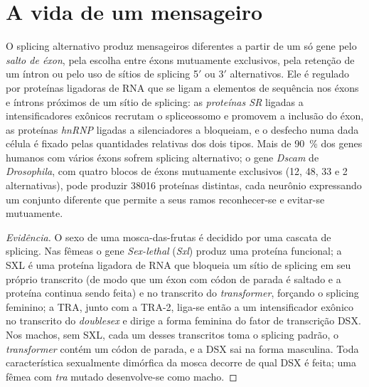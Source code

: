 \section{A vida de um mensageiro}

\begin{definition}\label{def:b3:rna-regulation:splicing}
O splicing alternativo produz mensageiros diferentes a partir de um só
gene pelo \emph{salto de éxon}, pela escolha entre éxons mutuamente
exclusivos, pela retenção de um íntron ou pelo uso de sítios de
splicing 5$'$ ou 3$'$ alternativos. Ele é regulado por proteínas
ligadoras de RNA que se ligam a elementos de sequência nos éxons e
íntrons próximos de um sítio de splicing: as \emph{proteínas SR}
ligadas a intensificadores exônicos recrutam o spliceossomo e promovem
a inclusão do éxon, as proteínas \emph{hnRNP} ligadas a silenciadores
a bloqueiam, e o desfecho numa dada célula é fixado pelas quantidades
relativas dos dois tipos. Mais de \qty{90}{\%} dos genes humanos com
vários éxons sofrem splicing alternativo; o gene \emph{Dscam} de
\emph{Drosophila}, com quatro blocos de éxons mutuamente exclusivos
(12, 48, 33 e 2 alternativas), pode produzir \num{38016} proteínas
distintas, cada neurônio expressando um conjunto diferente que permite
a seus ramos reconhecer-se e evitar-se mutuamente.
\end{definition}

\begin{proof}[Evidência]
O sexo de uma mosca-das-frutas é decidido por uma cascata de splicing.
Nas fêmeas o gene \emph{Sex-lethal} (\emph{Sxl}) produz uma proteína
funcional; a SXL é uma proteína ligadora de RNA que bloqueia um sítio
de splicing em seu próprio transcrito (de modo que um éxon com códon
de parada é saltado e a proteína continua sendo feita) e no transcrito
do \emph{transformer}, forçando o splicing feminino; a TRA, junto com
a TRA-2, liga-se então a um intensificador exônico no transcrito do
\emph{doublesex} e dirige a forma feminina do fator de transcrição
DSX. Nos machos, sem SXL, cada um desses transcritos toma o splicing
padrão, o \emph{transformer} contém um códon de parada, e a DSX sai na
forma masculina. Toda característica sexualmente dimórfica da mosca
decorre de qual DSX é feita; uma fêmea com \emph{tra} mutado
desenvolve-se como macho.
\end{proof}

